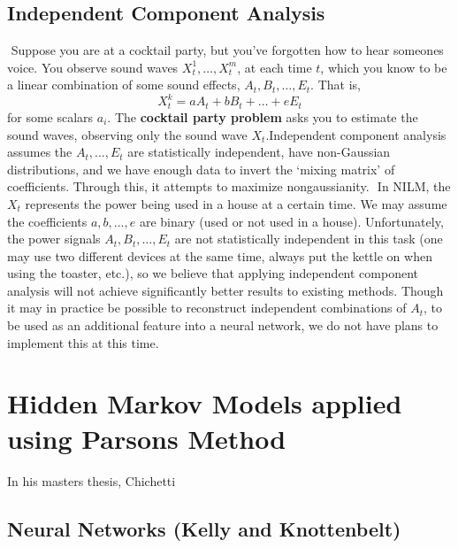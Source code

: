 \documentclass{article}
\begin{document}

\subsection{Independent Component Analysis}
​
Suppose you are at a cocktail party, but you've forgotten how to hear someones voice. You observe sound waves $X^1_t, \dots, X^m_t$, at each time $t$, which you know to be a linear combination of some sound effects, $A_t, B_t, \dots, E_t$. That is,
%
\[ X_t^k = a A_t + b B_t + \dots + e E_t \]
%
for some scalars $a_i$. The {\bf cocktail party problem} asks you to estimate the sound waves, observing only the sound wave $X_t$.
​
Independent component analysis assumes the $A_t, \dots, E_t$ are statistically independent, have non-Gaussian distributions, and we have enough data to invert the `mixing matrix' of coefficients. Through this, it attempts to maximize nongaussianity. %
​
In NILM, the $X_t$ represents the power being used in a house at a certain time. We may assume the coefficients $a, b, \dots, e$ are binary (used or not used in a house). Unfortunately, the power signals $A_t, B_t, \dots, E_t$ are not statistically independent in this task (one may use two different devices at the same time, always put the kettle on when using the toaster, etc.), so we believe that applying independent component analysis will not achieve significantly better results to existing methods. Though it may in practice be possible to reconstruct independent combinations of $A_t$, to be used as an additional feature into a neural network, we do not have plans to implement this at this time. \cite{Aapo}


\section{Hidden Markov Models applied using Parsons Method}

In his masters thesis, Chichetti \cite{Cicchetti}

\subsection{Neural Networks (Kelly and Knottenbelt)}
\end{document}
